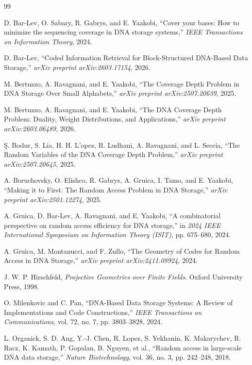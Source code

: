 \documentclass[11pt,a4paper]{article}
\numberwithin{equation}{section}
\theoremstyle{definition}
\theoremstyle{definition}
\begin{document}
\begin{thebibliography}{99}

D. Bar-Lev, O. Sabary, R. Gabrys, and E. Yaakobi,
``Cover your bases: How to minimize the sequencing coverage in DNA storage systems,''
\emph{IEEE Transactions on Information Theory}, 2024.

D. Bar-Lev,
``Coded Information Retrieval for Block-Structured DNA-Based Data Storage,''
\emph{arXiv preprint arXiv:2603.17154}, 2026.

M. Bertuzzo, A. Ravagnani, and E. Yaakobi,
``The Coverage Depth Problem in DNA Storage Over Small Alphabets,''
\emph{arXiv preprint arXiv:2507.20639}, 2025.

M. Bertuzzo, A. Ravagnani, and E. Yaakobi,
``The DNA Coverage Depth Problem: Duality, Weight Distributions, and Applications,''
\emph{arXiv preprint arXiv:2603.06489}, 2026.

\c{S}. Bodur, S. Lia, H. H. L'opez, R. Ludhani, A. Ravagnani, and L. Seccia,
``The Random Variables of the DNA Coverage Depth Problem,''
\emph{arXiv preprint arXiv:2507.20645}, 2025.

A. Boruchovsky, O. Elishco, R. Gabrys, A. Gruica, I. Tamo, and E. Yaakobi,
``Making it to First: The Random Access Problem in DNA Storage,''
\emph{arXiv preprint arXiv:2501.12274}, 2025.

A. Gruica, D. Bar-Lev, A. Ravagnani, and E. Yaakobi,
``A combinatorial perspective on random access efficiency for DNA storage,''
in \emph{2024 IEEE International Symposium on Information Theory (ISIT)},
pp. 675--680, 2024.

A. Gruica, M. Montanucci, and F. Zullo,
``The Geometry of Codes for Random Access in DNA Storage,''
\emph{arXiv preprint arXiv:2411.08924}, 2024.

J. W. P. Hirschfeld,
\emph{Projective Geometries over Finite Fields}.
Oxford University Press, 1998.

O. Milenkovic and C. Pan,
``DNA-Based Data Storage Systems: A Review of Implementations and Code Constructions,''
\emph{IEEE Transactions on Communications}, vol. 72, no. 7,
pp. 3803--3828, 2024.

L. Organick, S. D. Ang, Y.-J. Chen, R. Lopez, S. Yekhanin,
K. Makarychev, R. Racz, K. Kamath, P. Gopalan, B. Nguyen, et al.,
``Random access in large-scale DNA data storage,''
\emph{Nature Biotechnology}, vol. 36, no. 3, pp. 242--248, 2018.


\end{thebibliography}
\end{document}
